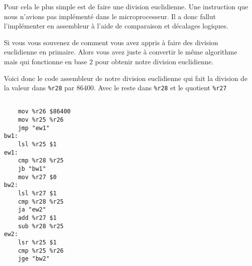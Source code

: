 \documentclass[10pt,a4paper,notitlepage ]{report}
\begin{document}
			Pour cela le plus simple est de faire une division euclidienne. Une instruction que nous n'avions pas implémenté dans le microprocesseur. Il a donc fallut l'implémenter en assembleur à l'aide de comparaison et décalages logiques.

			Si vous vous souvenez de comment vous avez appris à faire des division euclidienne en primaire. Alors vous avez juste à convertir le même algorithme mais qui fonctionne en base 2 pour obtenir notre division euclidienne.

			Voici donc le code assembleur de notre division euclidienne qui fait la division de la valeur dans \texttt{\%r28} par 86400. Avec le reste dans \texttt{\%r28} et le quotient \texttt{\%r27}

\begin{lstlisting}

	mov %r26 $86400
	mov %r25 %r26
	jmp "ew1"
bw1:
	lsl %r25 $1
ew1:
	cmp %r28 %r25
	jb "bw1"
	mov %r27 $0
bw2:
	lsl %r27 $1
	cmp %r28 %r25
	ja "ew2"
	add %r27 $1
	sub %r28 %r25
ew2:
	lsr %r25 $1
	cmp %r25 %r26
	jge "bw2"

\end{lstlisting}
	
\end{document}
